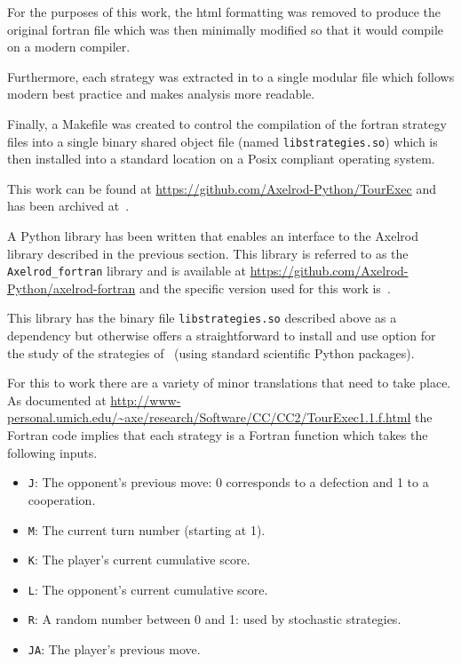 \documentclass{article}
\begin{document}
For the purposes of this work, the html formatting was removed to produce the original
fortran file which was then minimally modified so that it would compile on a modern
compiler.

Furthermore, each strategy was extracted in to a single modular file which
follows modern best practice and makes analysis more readable.

Finally, a Makefile was created to control the compilation of the fortran
strategy files into a single binary shared object file (named
\texttt{libstrategies.so}) which is then installed into a standard location on
a Posix compliant operating system.

This work can be found
at \url{https://github.com/Axelrod-Python/TourExec} and has been archived
at~\cite{TourExec}.

A Python library has been written that enables an interface to
the Axelrod library described in the previous section. This library is referred
to as the \texttt{Axelrod\_fortran} library and is available
at \url{https://github.com/Axelrod-Python/axelrod-fortran} and the specific
version used for this work is~\cite{Axelrod_fortran}.

This library has the binary file \texttt{libstrategies.so} described above as
a dependency but otherwise offers a straightforward to install and use option
for the study of the strategies of~\cite{Axelrod1980b} (using standard
scientific Python packages).

For this to work there are a variety of minor translations that need to take
place. As documented at
\url{http://www-personal.umich.edu/~axe/research/Software/CC/CC2/TourExec1.1.f.html}
the Fortran code implies that each strategy is a Fortran function which takes
the following inputs.

\begin{itemize}
    \item  \texttt{J}: The opponent's previous move: 0 corresponds to a
        defection and 1 to a cooperation.
    \item \texttt{M}: The current turn number (starting at 1).
    \item \texttt{K}: The player's current cumulative score.
    \item \texttt{L}: The opponent's current cumulative score.
    \item \texttt{R}: A random number between 0 and 1: used by stochastic
        strategies.
    \item \texttt{JA}: The player's previous move.
\end{itemize}
\end{document}
